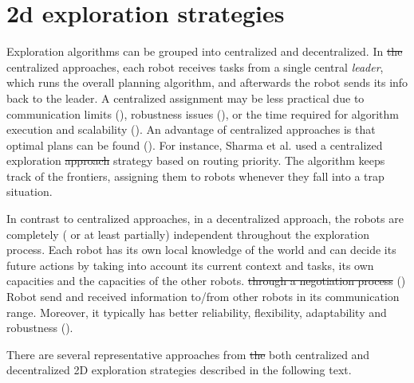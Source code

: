 \section{2d exploration strategies}

Exploration algorithms can be grouped into centralized and decentralized. In \st{the}  centralized approaches, each robot receives tasks from a single central \emph{leader}, which runs the overall planning algorithm, and afterwards the robot sends its info back to the leader. {\color{red}A} centralized assignment may be less practical due to communication limits (\cite{Dias2000}), robustness issues (\cite{Dias2006}), or {\color{red}the} time required for algorithm execution and scalability (\cite{Julia2012}). An advantage of centralized approaches is that optimal plans can be found (\cite{Yan2011}). For instance, Sharma et al. \cite{SharmaHonc2016} used a centralized exploration \st{approach} {\color{red}strategy} based on routing priority. The algorithm keeps track of the frontiers, assigning them to robots whenever they fall into {\color{green}a trap situation}.


In contrast to centralized approaches, in a decentralized approach, the robots are completely ({\color{red} or at least partially}) independent throughout the exploration process. Each robot has its own local knowledge of the world and can decide its future actions by taking into account its current context and tasks, its own capacities and the capacities of the other robots. \st{through a negotiation process} (\cite{Yan2013}) {\color{red} Robot send and received information to/from other robots in its communication range}. Moreover, it typically has better reliability, flexibility, adaptability and robustness (\cite{Zlot2002}). 
 
There are several representative approaches from \st{the} both centralized and decentralized 2D exploration strategies described in the following text. 

